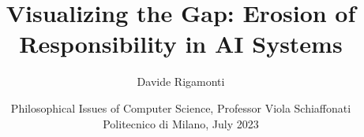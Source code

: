 \documentclass{article}
\title{Visualizing the Gap: Erosion of Responsibility in AI Systems}
\author{Davide Rigamonti}
\date{\small Philosophical Issues of Computer Science, Professor Viola Schiaffonati \\ 
Politecnico di Milano, July 2023}
\begin{document}
\maketitle




\begin{multicols}{2}

    

    

    

    

    

    

    

    \printbibliography

\end{multicols}
\end{document}
